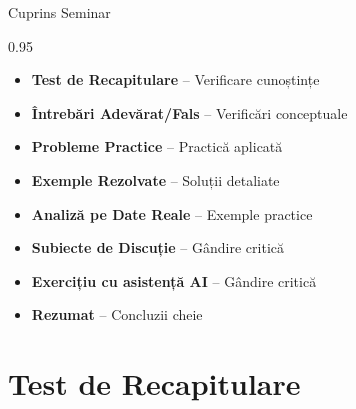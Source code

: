 \documentclass[9pt, aspectratio=169, t]{beamer}
\subtitle{Seminar 3: Modele ARIMA}
\begin{document}
{
\begin{frame}
    \titlepage
\end{frame}
}

\begin{frame}{Cuprins Seminar}
    \begin{cminipage}{0.95\textwidth}
    \begin{itemize}\setlength{\itemsep}{0pt}
        \item \textbf{Test de Recapitulare} -- Verificare cunoștințe
        \vspace{0.15cm}
        \item \textbf{Întrebări Adevărat/Fals} -- Verificări conceptuale
        \vspace{0.15cm}
        \item \textbf{Probleme Practice} -- Practică aplicată
        \vspace{0.15cm}
        \item \textbf{Exemple Rezolvate} -- Soluții detaliate
        \vspace{0.15cm}
        \item \textbf{Analiză pe Date Reale} -- Exemple practice
        \vspace{0.15cm}
        \item \textbf{Subiecte de Discuție} -- Gândire critică
        \vspace{0.15cm}
        \item \textbf{Exercițiu cu asistență AI} -- Gândire critică
        \vspace{0.15cm}
        \item \textbf{Rezumat} -- Concluzii cheie
    \end{itemize}
    \end{cminipage}
\end{frame}


\section{Test de Recapitulare}
\end{document}
